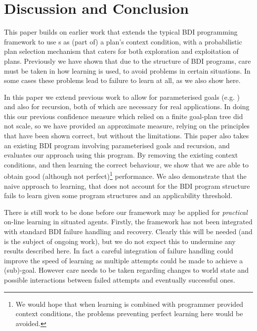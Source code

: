 \section{Discussion and Conclusion}\label{sec:discussion}

This paper builds on earlier work \cite{Airiau:IJAT:09,Singh:AAMAS10} that extends
the typical BDI programming framework to use \dt{}s as (part of) a
plan's context condition, with a probabilistic plan selection
mechanism that caters for both exploration and exploitation of plans.
Previously we have shown that due to the structure of BDI
programs, care must be taken in how learning is used, to avoid
problems in certain situations. In some cases these problems lead to
failure to learn at all, as we also show here.

In this paper we extend previous work to allow for parameterised
goals (e.g. ) and also for recursion, both
of which are necessary for real applications. In doing this our
previous confidence measure which relied on a finite goal-plan tree
did not scale, so we have provided an approximate measure, relying
on the principles that have been shown correct, but without the
limitations. This paper also takes an existing BDI program involving
parameterised goals and recursion, and evaluates our approach using
this program. By removing the existing context conditions, and then
learning the correct behaviour, we show that we are able to obtain
good (although not perfect)\footnote{We would hope that when learning
is combined with programmer provided context conditions, the problems
preventing perfect learning here would be avoided.} performance. We
also demonstrate that the naive approach to learning, that does not
account for the BDI program structure fails to learn given
some program structures and an applicability threshold.

There is still work to be done before our framework may be applied for {\it practical} on-line learning in situated agents. Firstly, the framework has not been integrated with standard BDI failure handling and recovery. Clearly
this will be needed (and is the subject of ongoing work), but we do not expect this to undermine any results described here. In fact a careful integration of
failure handling could improve the speed of learning as multiple
attempts could be made to achieve a (sub)-goal. However care needs
to be taken regarding changes to world state and possible interactions
between failed attempts and eventually successful ones.

